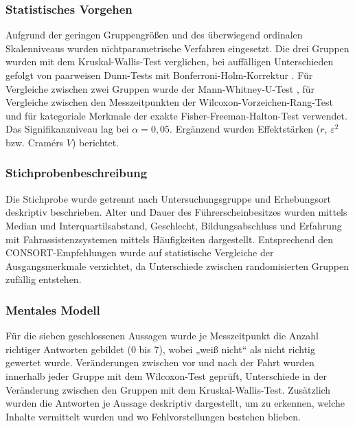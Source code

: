 \subsubsection{Statistisches Vorgehen}
\label{subsubsec:statistisches_vorgehen}

Aufgrund der geringen Gruppengrößen und des überwiegend ordinalen Skalenniveaus wurden nichtparametrische Verfahren eingesetzt. Die drei Gruppen wurden mit dem Kruskal-Wallis-Test \cite{kruskal1952use} verglichen, bei auffälligen Unterschieden gefolgt von paarweisen Dunn-Tests \cite{dunn1964multiple} mit Bonferroni-Holm-Korrektur \cite{holm1979simple}. Für Vergleiche zwischen zwei Gruppen wurde der Mann-Whitney-U-Test \cite{mann1947test}, für Vergleiche zwischen den Messzeitpunkten der Wilcoxon-Vorzeichen-Rang-Test \cite{wilcoxon1945individual} und für kategoriale Merkmale der exakte Fisher-Freeman-Halton-Test \cite{freeman1951note} verwendet. Das Signifikanzniveau lag bei $\alpha = 0{,}05$. Ergänzend wurden Effektstärken ($r$, $\varepsilon^2$ bzw. Cramérs $V$) berichtet.

\subsubsection{Stichprobenbeschreibung}
\label{subsubsec:stichprobenbeschreibung}

Die Stichprobe wurde getrennt nach Untersuchungsgruppe und Erhebungsort deskriptiv beschrieben. Alter und Dauer des Führerscheinbesitzes wurden mittels Median und Interquartilsabstand, Geschlecht, Bildungsabschluss und Erfahrung mit Fahrassistenzsystemen mittels Häufigkeiten dargestellt. Entsprechend den CONSORT-Empfehlungen \cite{moher2010consort} wurde auf statistische Vergleiche der Ausgangsmerkmale verzichtet, da Unterschiede zwischen randomisierten Gruppen zufällig entstehen.

\subsubsection{Mentales Modell}

Für die sieben geschlossenen Aussagen wurde je Messzeitpunkt die Anzahl richtiger Antworten gebildet (0 bis 7), wobei „weiß nicht“ als nicht richtig gewertet wurde. Veränderungen zwischen vor und nach der Fahrt wurden innerhalb jeder Gruppe mit dem Wilcoxon-Test geprüft, Unterschiede in der Veränderung zwischen den Gruppen mit dem Kruskal-Wallis-Test. Zusätzlich wurden die Antworten je Aussage deskriptiv dargestellt, um zu erkennen, welche Inhalte vermittelt wurden und wo Fehlvorstellungen bestehen blieben.

